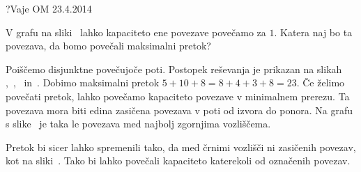 \begin{naloga}{?}{Vaje OM 23.4.2014}
\begin{vprasanje}
V grafu na sliki~\fig{} lahko kapaciteto ene povezave povečamo za $1$.
Katera naj bo ta povezava, da bomo povečali maksimalni pretok?

\begin{slika}
\pgfslika
{}
\end{slika}
\end{vprasanje}

\begin{odgovor}
Poiščemo disjunktne povečujoče poti.
Postopek reševanja je prikazan na slikah~%
,~,~ in~.
Dobimo maksimalni pretok $5+10+8 = 8+4+3+8 = 23$.
Če želimo povečati pretok,
lahko povečamo kapaciteto povezave v minimalnem prerezu.
Ta povezava mora biti edina zasičena povezava v poti od izvora do ponora.
Na grafu s slike~
je taka le povezava med najbolj zgornjima vozliščema.

Pretok bi sicer lahko spremenili tako,
da med črnimi vozlišči ni zasičenih povezav, kot na sliki~.
Tako bi lahko povečali kapaciteto katerekoli od označenih povezav.

\begin{slika}
\pgfslika[pretok4a]
\end{slika}
\begin{slika}
\pgfslika[pretok4b]
\end{slika}
\begin{slika}
\pgfslika[pretok4c]
\end{slika}
\begin{slika}
\pgfslika[pretok4d]
\end{slika}
\begin{slika}
\pgfslika[pretok4e]
\end{slika}
\end{odgovor}
\end{naloga}
